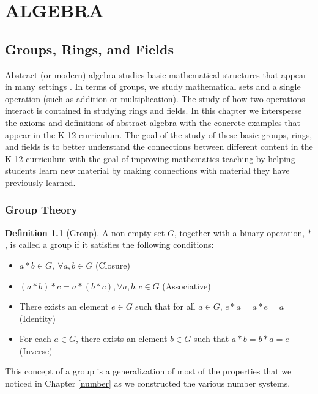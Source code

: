\documentclass[
]{book}
\theoremstyle{definition}
\newtheorem{definition}{Definition}[chapter]
\theoremstyle{definition}
\theoremstyle{definition}
\theoremstyle{definition}
\theoremstyle{remark}
\begin{document}
\hypertarget{part-algebra}{%
\part{ALGEBRA}\label{part-algebra}}

\hypertarget{group-1}{%
\chapter{Groups, Rings, and Fields}\label{group-1}}

Abstract (or modern) algebra studies basic mathematical structures that appear in many settings . In terms of groups, we study mathematical sets and a single operation (such as addition or multiplication). The study of how two operations interact is contained in studying rings and fields. In this chapter we intersperse the axioms and definitions of abstract algebra with the concrete examples that appear in the K-12 curriculum. The goal of the study of these basic groups, rings, and fields is to better understand the connections between different content in the K-12 curriculum with the goal of improving mathematics teaching by helping students learn new material by making connections with material they have previously learned.

\hypertarget{groups}{%
\section{Group Theory}\label{groups}}

\begin{definition}[Group]

A non-empty set \(G\), together with a binary operation, \(*\), is called a group if it satisfies the following conditions:

\begin{itemize}
\item
  \(a*b \in G, \: \forall a,b \in G\) (Closure)
\item
  \((a*b)*c = a * (b*c), \forall a,b,c \in G\) (Associative)
\item
  There exists an element \(e \in G\) such that for all \(a\in G\), \(e*a=a*e=a\) (Identity)
\item
  For each \(a\in G\), there exists an element \(b\in G\) such that \(a*b=b*a=e\) (Inverse)
\end{itemize}

\end{definition}

This concept of a group is a generalization of most of the properties that we noticed in Chapter \ref{number} as we constructed the various number systems.
\end{document}
